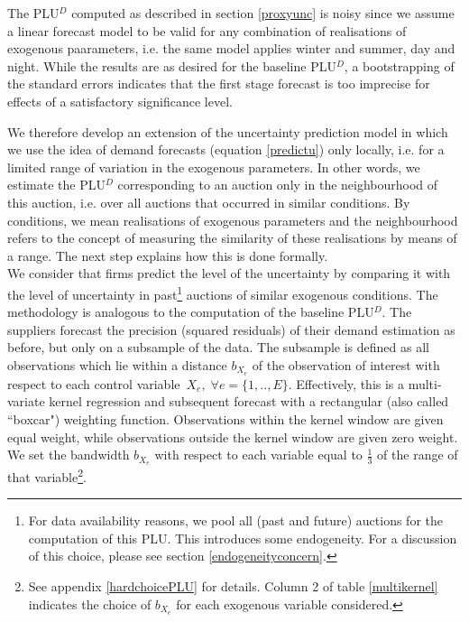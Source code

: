 The PLU$^D$ computed as described in section \ref{proxyunc} is noisy since we assume a linear forecast model to be valid for any combination of realisations of exogenous paarameters, i.e. the same model applies winter and summer, day and night. 
While the results are as desired for the baseline PLU$^D$, a bootstrapping of the standard errors indicates that the first stage forecast is too imprecise for effects of a satisfactory significance level. \

We therefore develop an extension of the uncertainty prediction model  in which we use the idea of demand forecasts (equation \ref{predictu}) only locally, i.e. for a limited range of variation in the exogenous parameters. In other words, we estimate the PLU$^D$ corresponding to an auction only in the neighbourhood of this auction, i.e. over all auctions that occurred in similar conditions. By conditions, we mean realisations of exogenous parameters and the neighbourhood refers to the concept of measuring the similarity of these realisations by means of a range. The next step explains how this is done formally. \\

We consider that firms predict the level of the uncertainty by comparing it with the level of uncertainty in past\footnote{For data availability reasons, we pool all (past and future) auctions for the computation of this PLU. This introduces some endogeneity. For a discussion of this choice, please see section \ref{endogeneityconcern}.} auctions of similar exogenous conditions. 
The methodology is analogous to the computation of the baseline PLU$^D$. The suppliers forecast the precision (squared residuals) of their demand estimation as before, but only on a subsample of the data. The subsample is defined as all observations which lie within a distance $b_{X_e}$ of the observation of interest with respect to each %
control variable~$X_e , \; \forall e=\{1,..,E\}$. Effectively, this is a multi-variate kernel regression and subsequent forecast with a rectangular (also called ``boxcar") weighting function. Observations within the kernel window are given equal weight, while observations outside the kernel window are given zero weight. We set the bandwidth $b_{X_e}$ with respect to each variable equal to $\frac{1}{3}$ of the range of that variable\footnote{See appendix \ref{hardchoicePLU} for details. Column 2 of table \ref{multikernel} indicates the choice of $b_{X_e}$ for each exogenous variable considered.}. \\

